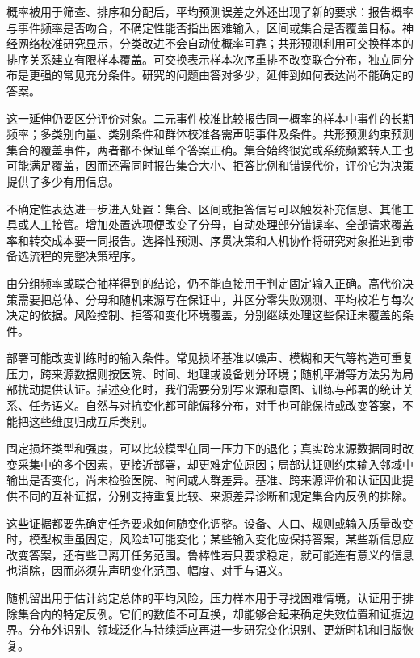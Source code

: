 概率被用于筛查、排序和分配后，平均预测误差之外还出现了新的要求：报告概率与事件频率是否吻合，不确定性能否指出困难输入，区间或集合是否覆盖目标。神经网络校准研究显示，分类改进不会自动使概率可靠；共形预测利用可交换样本的排序关系建立有限样本覆盖。可交换表示样本次序重排不改变联合分布，独立同分布是更强的常见充分条件。研究的问题由答对多少，延伸到如何表达尚不能确定的答案。

这一延伸仍要区分评价对象。二元事件校准比较报告同一概率的样本中事件的长期频率；多类别向量、类别条件和群体校准各需声明事件及条件。共形预测约束预测集合的覆盖事件，两者都不保证单个答案正确。集合始终很宽或系统频繁转人工也可能满足覆盖，因而还需同时报告集合大小、拒答比例和错误代价，评价它为决策提供了多少有用信息。

不确定性表达进一步进入处置：集合、区间或拒答信号可以触发补充信息、其他工具或人工接管。增加处置选项便改变了分母，自动处理部分错误率、全部请求覆盖率和转交成本要一同报告。选择性预测、序贯决策和人机协作将研究对象推进到带备选流程的完整决策程序。

由分组频率或联合抽样得到的结论，仍不能直接用于判定固定输入正确。高代价决策需要把总体、分母和随机来源写在保证中，并区分零失败观测、平均校准与每次决定的依据。风险控制、拒答和变化环境覆盖，分别继续处理这些保证未覆盖的条件。

部署可能改变训练时的输入条件。常见损坏基准以噪声、模糊和天气等构造可重复压力，跨来源数据则按医院、时间、地理或设备划分环境；随机平滑等方法另为局部扰动提供认证。描述变化时，我们需要分别写来源和意图、训练与部署的统计关系、任务语义。自然与对抗变化都可能偏移分布，对手也可能保持或改变答案，不能把这些维度归成互斥类别。

固定损坏类型和强度，可以比较模型在同一压力下的退化；真实跨来源数据同时改变采集中的多个因素，更接近部署，却更难定位原因；局部认证则约束输入邻域中输出是否变化，尚未检验医院、时间或人群差异。基准、跨来源评价和认证因此提供不同的互补证据，分别支持重复比较、来源差异诊断和规定集合内反例的排除。

这些证据都要先确定任务要求如何随变化调整。设备、人口、规则或输入质量改变时，模型权重虽固定，风险却可能变化；某些输入变化应保持答案，某些新信息应改变答案，还有些已离开任务范围。鲁棒性若只要求稳定，就可能连有意义的信息也消除，因而必须先声明变化范围、幅度、对手与语义。

随机留出用于估计约定总体的平均风险，压力样本用于寻找困难情境，认证用于排除集合内的特定反例。它们的数值不可互换，却能够合起来确定失效位置和证据边界。分布外识别、领域泛化与持续适应再进一步研究变化识别、更新时机和旧版恢复。

